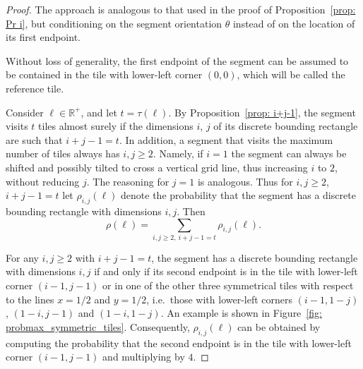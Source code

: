 \documentclass[12pt, a4paper]{article}
\newcommand{\funt}{\tau} %
\newcommand{\probmax}{\rho} %
\newcommand{\len}{\ell} %
\newcommand{\tiles}{t} %
\begin{document}
\begin{proof}
The approach is analogous to that used in the proof of Proposition~\ref{prop: Pr i}, but conditioning on the segment orientation $\theta$ instead of on the location of its first endpoint.


Without loss of generality, the first endpoint of the segment can be assumed to be contained in the tile with lower-left corner $(0,0)$, which will be called the reference tile.

Consider $\len \in \mathbb R^+$, and let $\tiles = \funt(\len)$. By Proposition~\ref{prop: i+j-1}, the segment visits $\tiles$ tiles almost surely if the dimensions $i$, $j$ of its discrete bounding rectangle are such that $i+j-1=\tiles$. In addition, a segment that visits the maximum number of tiles always has $i, j \geq 2$. Namely, if $i=1$ the segment can always be shifted and possibly tilted to cross a vertical grid line, thus increasing $i$ to $2$, without reducing $j$. The reasoning for $j=1$ is analogous. Thus for $i, j \geq 2$, $i+j-1=\tiles$ let $\probmax_{i,j}(\len)$ denote the probability that the segment has a discrete bounding rectangle with dimensions $i, j$. Then
\begin{equation}
\label{eq: probmax len probmax i,j len}
\probmax(\len) =  \sum_{i,j \geq 2,\ i+j-1=\tiles} \probmax_{i,j}(\len).
\end{equation}

For any $i, j \geq 2$ with $i+j-1=\tiles$, the segment has a discrete bounding rectangle with dimensions $i, j$ if and only if its second endpoint is in the tile with lower-left corner $(i-1,j-1)$ or in one of the other three symmetrical tiles with respect to the lines $x=1/2$ and $y=1/2$, i.e.~those with lower-left corners $(i-1,1-j)$, $(1-i,j-1)$ and $(1-i,1-j)$. An example is shown in Figure~\ref{fig: probmax_symmetric_tiles}. Consequently, $\probmax_{i,j}(\len)$ can be obtained by computing the probability that the second endpoint is in the tile with lower-left corner $(i-1,j-1)$ and multiplying by $4$.


\end{proof}
\end{document}
